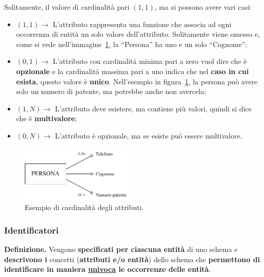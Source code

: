 \documentclass[a4paper]{article}
\newcommand{\dquotes}[1]{``#1''}
\begin{document}
	\noindent
	Solitamente, il valore di cardinalità pari $\left(1,1\right)$,  ma si possono avere vari casi:
	
	\begin{itemize}
		\item $\left(1, 1\right) \longrightarrow$ L'attributo rappresenta una funzione che associa ad ogni occorrenza di entità un solo valore dell'attributo. Solitamente viene omesso e, come si vede nell'immagine~\ref{img: esempio cardinalità attributi}, la \dquotes{Persona} ha uno e un solo \dquotes{Cognome};
		
		\item $\left(0, 1\right) \longrightarrow$ L'attributo con cardinalità minima pari a zero vuol dire che è \textbf{opzionale} e la cardinalità massima pari a uno indica che nel \textbf{caso in cui esista}, questo valore è \textbf{unico}. Nell'esempio in figura~\ref{img: esempio cardinalità attributi}, la persona può avere solo un numero di patente, ma potrebbe anche non avercela;
		
		\item $\left(1, N\right) \longrightarrow$ L'attributo deve esistere, ma contiene più valori, quindi si dice che è \textbf{multivalore};
		
		\item $\left(0, N\right) \longrightarrow$ L'attributo è opzionale, ma se esiste può essere multivalore.
	\end{itemize}
	
	\begin{figure}[!htp]
		\centering
		\includegraphics[width=0.5\textwidth]{img/cardinalita-attributi_def.pdf}
		\caption{Esempio di cardinalità degli attributi.}\label{img: esempio cardinalità attributi}
	\end{figure}

	\newpage

	\subsubsection{Identificatori}
	
	\textcolor{Red3}{\textbf{Definizione.}} Vengono \textbf{specificati per ciascuna entità} di uno schema e \textbf{descrivono i} concetti (\textbf{attributi e/o entità}) dello schema che \textbf{permettono di identificare in maniera \underline{univoca} le occorrenze delle entità}.\newline
	
\end{document}
